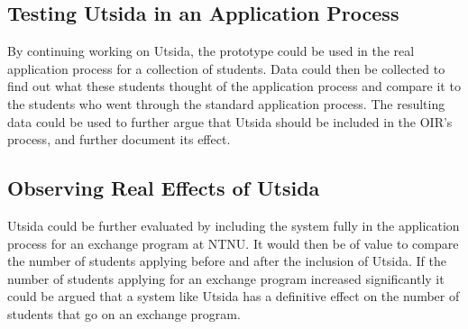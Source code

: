 \subsection{Testing Utsida in an Application Process}

By continuing working on Utsida, the prototype could be used in the real application process for a collection of students. Data could then be collected to find out what these students thought of the application process and compare it to the students who went through the standard application process. The resulting data could be used to further argue that Utsida should be included in the OIR's process, and further document its effect.

\subsection{Observing Real Effects of Utsida}

Utsida could be further evaluated by including the system fully in the application process for an exchange program at NTNU. It would then be of value to compare the number of students applying before and after the inclusion of Utsida. If the number of students applying for an exchange program increased significantly it could be argued that a system like Utsida has a definitive effect on the number of students that go on an exchange program. 



\cleardoublepage